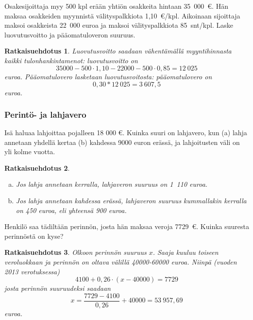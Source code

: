 \documentclass[a4paper,10pt]{article}\usepackage[]{graphicx}\usepackage[]{color}
\newtheorem*{ratk}{Ratkaisuehdotus}
\begin{document}
\begin{teht} Osakesijoittaja myy 500 kpl erään yhtiön osakkeita hintaan 35~000~\euro. Hän maksaa osakkeiden myynnistä välityspalkkiota 1,10~\euro/kpl. Aikoinaan sijoittaja maksoi osakkeista 22~000 euroa ja maksoi välityspalkkiota 85~snt/kpl. Laske luovutusvoitto ja pääomatuloveron suuruus.
\end{teht}
\begin{ratk}
	Luovutusvoitto saadaan vähentämällä myyntihinnasta kaikki tulonhankintamenot: luovutusvoitto on 
\[
	35000-500\cdot1,10-22000-500\cdot0,85 = 12~025
\]
euroa. Pääomatulovero lasketaan luovutusvoitosta: pääomatulovero on 
\[
	0,30*12~025 = 3~607{,}5
\]
euroa.
\end{ratk}






\subsubsection*{Perintö- ja lahjavero}

\begin{teht} Isä haluaa lahjoittaa pojalleen 18 000 \euro. Kuinka suuri on lahjavero, kun (a) lahja annetaan yhdellä kertaa (b) kahdessa 9000 euron erässä, ja lahjoitusten väli on yli kolme vuotta.
\end{teht}
\begin{ratk}

	\begin{enumerate}[(a)]
		\item Jos lahja annetaan kerralla, lahjaveron suuruus on 1~110 euroa.
		\item Jos lahja annetaan kahdessa erässä, lahjaveron suuruus kummallakin kerralla on 450 euroa, eli yhteensä 900 euroa. 
	\end{enumerate}
\end{ratk}

\begin{teht} Henkilö saa tädiltään perinnön, josta hän maksaa veroja 7729~\euro. Kuinka suuresta perinnöstä on kyse?
\end{teht}
\begin{ratk}
	Olkoon perinnön suuruus \(x\). Saaja kuuluu toiseen veroluokkaan ja perinnön on oltava välillä 40000-60000 euroa. Niinpä (vuoden 2013 verotuksessa)
\[
	4100 + 0,26\cdot(x - 40000) = 7729
\]
josta perinnön suuruudeksi saadaan
\[
	x = \frac{7729 - 4100}{0,26} + 40000 = 53~957{,}69 
\]
euroa.
\end{ratk}
\end{document}
